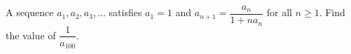 A sequence $a_1, a_2, a_3, \dots$ satisfies $a_1 = 1$ and $a_{n+1} = \dfrac{a_n}{1+na_n}$ for all $n \geq 1$. Find the value of $\dfrac{1}{a_{100}}$.
